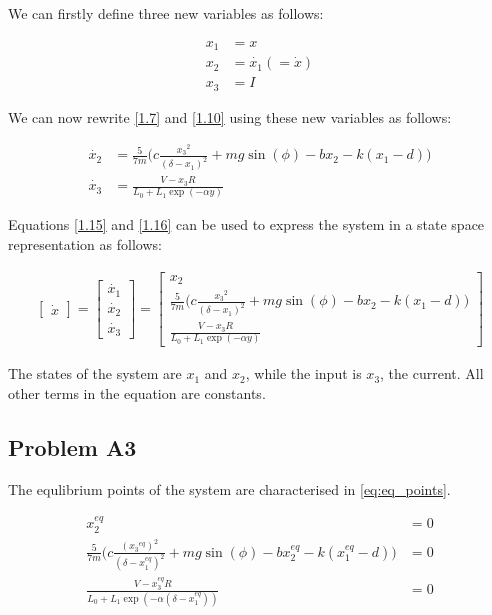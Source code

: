 \documentclass[a4paper,10pt,reqno]{amsart}
\numberwithin{equation}{section}
\begin{document}
We can firstly define three new variables as follows:

\begin{align}
x_1 &= x \label{1.12} \\
x_2 &= \dot{x_1} (= \dot{x}) \label{1.13} \\
x_3 &= I \label{1.14}
\end{align}

\newline We can now rewrite \ref{1.7} and \ref{1.10} using these new variables as follows:

\begin{align}
\dot{x_2} &= \frac{5}{7m}\bigg(c \frac{{x_3}^2}{(\delta - x_1)^2} + mg\sin(\phi) - bx_2 - k(x_1-d)\bigg) \label{1.15} \\
\dot{x_3} &= \frac{V - x_3 R}{L_0 + L_1\exp(-\alpha y)} \label{1.16}
\end{align}

\newline Equations \ref{1.15} and \ref{1.16} can be used to express the system in a state space representation as follows:

\begin{align}
\begin{bmatrix}
\dot{x}
\end{bmatrix} 
= 
\begin{bmatrix}
\dot{x_1}\\
\dot{x_2}\\
\dot{x_3}
\end{bmatrix}
= 
\begin{bmatrix}
x_2 \\
\frac{5}{7m}\bigg(c \frac{{x_3}^2}{(\delta - x_1)^2} + mg\sin(\phi) - bx_2 - k(x_1-d)\bigg)\\
\frac{V - x_3 R}{L_0 + L_1\exp(-\alpha y)}
\end{bmatrix}
\label{1.17}
\end{align}

\newline The states of the system are $x_1$ and $x_2$, while the input is $x_3$, the current. All other terms in the equation are constants.



\subsection{Problem A3}\label{sec:a3}
The equlibrium points of the system are characterised in \eqref{eq:eq_points}.

\begin{subequations}\label{eq:eq_points}
\begin{align}
      x^{eq}_{2} &= 0 \label{1.18a} \\
     \frac{5}{7m}\bigg(c \frac{({x_3}^{eq})^2}{(\delta - x_1^{eq})^2} + mg\sin(\phi) - bx_2^{eq} - k(x_1^{eq}-d)\bigg) &= 0 \label{1.18b} \\
     \frac{V - x_3^{eq}R}{L_0 + L_1\exp(-\alpha(\delta - x_1^{eq}))} &= 0 \label{1.18c}
\end{align}
\end{subequations}
\end{document}
